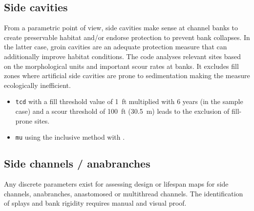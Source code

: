 \subsection{Side cavities}\label{sec:sidecav}
From a parametric point of view, side cavities make sense at channel banks to create preservable habitat and/or endorse protection to prevent bank collapses. In the latter case, groin cavities are an adequate protection measure that can additionally improve habitat conditions. The code analyses relevant sites based on the morphological units and important scour rates at banks. It excludes fill zones where artificial side cavities are prone to sedimentation making the measure ecologically inefficient.

\begin{itemize}
	\item \texttt{tcd} with a fill threshold value of 1~ft multiplied with 6 years (in the sample case) and a scour threshold of 100~ft (30.5~m) leads to the exclusion of fill-prone sites.
	\item \texttt{mu} using the inclusive method with .
\end{itemize}


\clearpage
\subsection{Side channels / anabranches}\label{sec:sidechnl}
Any discrete parameters exist for assessing design or lifespan maps for side channels, anabranches, anastomosed or multithread channels. The identification of splays and bank rigidity requires manual and visual proof.\\

